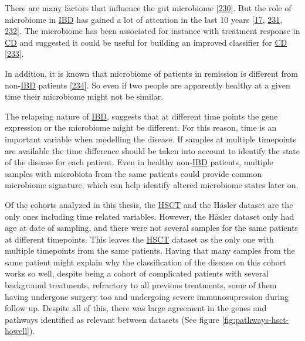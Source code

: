 \documentclass[
  12pt,
  a4paper,
  twoside,
  openright]{book}
\begin{document}
There are many factors that influence the gut microbiome {[}\protect\hyperlink{ref-hasan2019}{230}{]}.
But the role of microbiome in \protect\hyperlink{acronyms_IBD}{IBD} has gained a lot of attention in the last 10 years {[}\protect\hyperlink{ref-khanna2014}{17}, \protect\hyperlink{ref-bringiotti2014}{231}, \protect\hyperlink{ref-lloyd-price2019}{232}{]}.
The microbiome has been associated for instance with treatment response in \protect\hyperlink{acronyms_CD}{CD} and suggested it could be useful for building an improved classifier for \protect\hyperlink{acronyms_CD}{CD} {[}\protect\hyperlink{ref-douglas2018}{233}{]}.

In addition, it is known that microbiome of patients in remission is different from non-\protect\hyperlink{acronyms_IBD}{IBD} patients {[}\protect\hyperlink{ref-halfvarson2017}{234}{]}.
So even if two people are apparently healthy at a given time their microbiome might not be similar.

The relapsing nature of \protect\hyperlink{acronyms_IBD}{IBD}, suggests that at different time points the gene expression or the microbiome might be different.
For this reason, time is an important variable when modelling the disease.
If samples at multiple timepoints are available the time difference should be taken into account to identify the state of the disease for each patient.
Even in healthy non-\protect\hyperlink{acronyms_IBD}{IBD} patients, multiple samples with microbiota from the same patients could provide common microbiome signature, which can help identify altered microbiome states later on.

Of the cohorts analyzed in this thesis, the \protect\hyperlink{acronyms_HSCT}{HSCT} and the Häsler dataset are the only ones including time related variables.
However, the Häsler dataset only had age at date of sampling, and there were not several samples for the same patients at different timepoints.
This leaves the \protect\hyperlink{acronyms_HSCT}{HSCT} dataset as the only one with multiple timepoints from the same patients.
Having that many samples from the same patient might explain why the classification of the disease on this cohort works so well, despite being a cohort of complicated patients with several background treatments, refractory to all previous treatments, some of them having undergone surgery too and undergoing severe immunosupression during follow up.
Despite all of this, there was large agreement in the genes and pathways identified as relevant between datasets (See figure \ref{fig:pathways-hsct-howell}).
\end{document}
